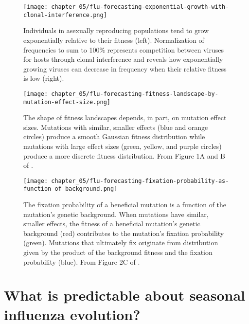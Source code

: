 \begin{figure}
  \centering
  \texttt{[image: chapter\_05/flu-forecasting-exponential-growth-with-clonal-interference.png]}
  \caption{Individuals in asexually reproducing populations tend to grow exponentially relative to their fitness (left).
    Normalization of frequencies to sum to 100\% represents competition between viruses for hosts through clonal interference and reveals how exponentially growing viruses can decrease in frequency when their relative fitness is low (right).\label{fig:exponential-growth-with-clonal-interference} }
\end{figure}

\begin{figure}
  \centering
  \texttt{[image: chapter\_05/flu-forecasting-fitness-landscape-by-mutation-effect-size.png]}
  \caption{The shape of fitness landscapes depends, in part, on mutation effect sizes.
    Mutations with similar, smaller effects (blue and orange circles) produce a smooth Gaussian fitness distribution while mutations with large effect sizes (green, yellow, and purple circles) produce a more discrete fitness distribution.
    From Figure 1A and B of \citet{Neher2013}.\label{fig:fitness-landscape-by-mutation-effect-size} }
\end{figure}

\begin{figure}
  \centering
  \texttt{[image: chapter\_05/flu-forecasting-fixation-probability-as-function-of-background.png]}
  \caption{The fixation probability of a beneficial mutation is a function of the mutation's genetic background.
    When mutations have similar, smaller effects, the fitness of a beneficial mutation's genetic background (red) contributes to the mutation's fixation probability (green).
    Mutations that ultimately fix originate from distribution given by the product of the background fitness and the fixation probability (blue).
    From Figure 2C of \citet{Neher2013}.\label{fig:fixation-probability-as-function-of-background} }
\end{figure}

\section{What is predictable about seasonal influenza evolution?}

